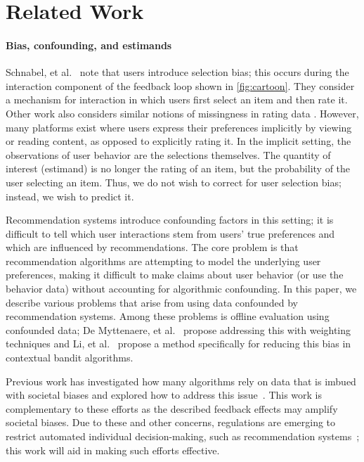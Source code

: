 \documentclass[sigconf]{acmart}
\begin{document}
\section{Related Work}
\label{sec:related}

\paragraph{Bias, confounding, and estimands}
\label{sec:estimands}
Schnabel, et al.~\cite{schnabel2016recommendations}
note that users introduce selection bias; this occurs during the interaction component of the feedback loop shown in \cref{fig:cartoon}. They consider a mechanism for interaction in which users first select an item and then rate it.  Other work also considers similar notions of
missingness in rating data \cite{marlin2009collaborative, ying2006leveraging}.
However, many platforms exist where users express their preferences implicitly by viewing or reading content, as opposed to explicitly rating it.
In the implicit setting, the observations of user behavior are the selections themselves.  The quantity of interest (estimand) is no longer the rating of an item, but the probability of the user selecting an item.  Thus, we do not wish to correct for user selection bias; instead, we wish to predict it.

Recommendation systems introduce confounding factors in this setting; it is difficult to tell which user interactions stem from users' true preferences and which are influenced by recommendations.  The core problem is that recommendation algorithms are attempting to model the underlying user preferences, making it difficult to make claims about user behavior (or use the behavior data) without accounting for algorithmic confounding.  In this paper, we describe various problems that arise from using data confounded by recommendation systems.
Among these problems is offline evaluation using confounded data; De Myttenaere, et al.~\cite{de2014reducing}
propose addressing this with weighting techniques and Li, et al.~\cite{li2011unbiased} propose a method specifically for reducing this bias in contextual bandit algorithms.

Previous work has investigated how many algorithms rely on data that is imbued with societal biases and explored how to address this issue~\cite{baeza2016data,Sweeney:2013,chander2016racist,sandvig2014auditing}.  This work is complementary to these efforts as the described feedback effects may amplify societal biases.
Due to these and other concerns, regulations are emerging to restrict automated individual decision-making, such as recommendation systems~\cite{goodman2016european}; this work will aid in making such efforts effective.
\end{document}
